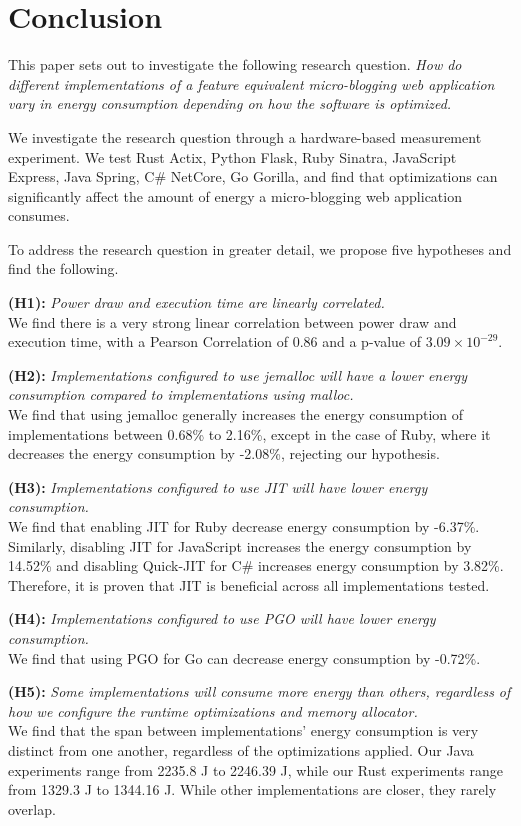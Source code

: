 \documentclass[main.tex]{subfiles}
\begin{document}
\section{Conclusion}

This paper sets out to investigate the following research question. \emph{How do different implementations of a feature equivalent micro-blogging web application vary in energy consumption depending on how the software is optimized.}

We investigate the research question through a hardware-based measurement experiment. We test Rust Actix, Python Flask, Ruby Sinatra, JavaScript Express, Java Spring, C\# NetCore, Go Gorilla, and find that optimizations can significantly affect the amount of energy a micro-blogging web application consumes.

To address the research question in greater detail, we propose five hypotheses and find the following.

\textbf{(H1):} \emph{Power draw and execution time are linearly correlated.}
\\
We find there is a very strong linear correlation between power draw and execution time, with a Pearson Correlation of 0.86 and a p-value of $3.09 \times 10^{-29}$.

\textbf{(H2):} \emph{Implementations configured to use jemalloc will have a lower energy consumption compared to implementations using malloc.}
\\
We find that using jemalloc generally increases the energy consumption of implementations between 0.68\% to 2.16\%, except in the case of Ruby, where it decreases the energy consumption by -2.08\%, rejecting our hypothesis.

\textbf{(H3):} \emph{Implementations configured to use JIT will have lower energy consumption.}
\\
We find that enabling JIT for Ruby decrease energy consumption by -6.37\%. Similarly, disabling JIT for JavaScript increases the energy consumption by 14.52\% and disabling Quick-JIT for C\# increases energy consumption by 3.82\%. Therefore, it is proven that JIT is beneficial across all implementations tested. 

\textbf{(H4):} \emph{Implementations configured to use PGO will have lower energy consumption.}
\\
We find that using PGO for Go can decrease energy consumption by -0.72\%.

\textbf{(H5):} \emph{Some implementations will consume more energy than others, regardless of how we configure the runtime optimizations and memory allocator.}
\\
We find that the span between implementations' energy consumption is very distinct from one another, regardless of the optimizations applied. Our Java experiments range from 2235.8 J to 2246.39 J, while our Rust experiments range from 1329.3 J to 1344.16 J. While other implementations are closer, they rarely overlap.
\end{document}
